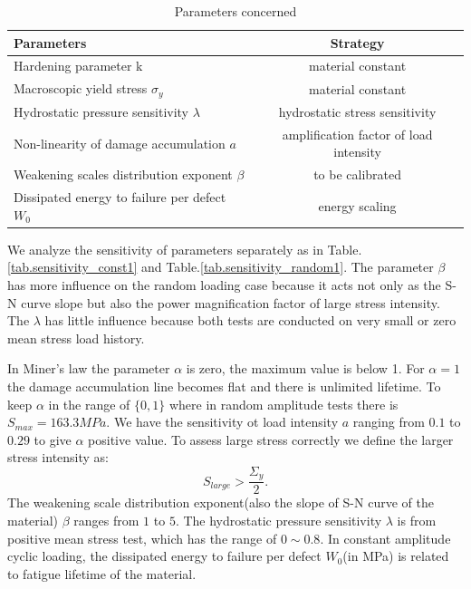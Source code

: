 \documentclass[3p,times,number,review]{elsarticle}
\begin{document}
\begin{table}[!h]
	\centering
	\begin{tabular}{l|c}
		\hline
		\textbf{Parameters}                                  & \multicolumn{1}{c}{\textbf{Strategy}} \\ \hline
		Hardening parameter k                                & material constant                      \\
		Macroscopic yield stress $\sigma_y$                  & material constant                      \\
		Hydrostatic pressure sensitivity $\lambda$           & hydrostatic stress sensitivity         \\
		Non-linearity of damage accumulation  $a$        & amplification factor of load intensity      \\
		Weakening scales distribution exponent  $\beta$      & to be calibrated                          \\
		Dissipated energy to failure per defect  $W_0$ & energy scaling               \\ \hline
	\end{tabular}
	\caption{Parameters concerned}
	\label{paras}
\end{table}

We analyze the sensitivity of parameters separately as in Table.\ref{tab.sensitivity_const1} and Table.\ref{tab.sensitivity_random1}. The parameter $\beta$ has more influence on the random loading case because it acts not only as the S-N curve slope but also the power magnification factor of large stress intensity. The $\lambda$ has little influence because both tests are conducted on very small or zero mean stress load history.


In Miner's law the parameter $\alpha$ is zero, the maximum value is below 1. For $\alpha=1$ the damage accumulation line becomes flat and there is unlimited lifetime. To keep $\alpha$ in the range of $\{0,1\}$ where in random amplitude tests there is $S_{max}=163.3MPa$. We have the sensitivity ot load intensity  $a$ ranging from $0.1$ to $0.29$ to give $\alpha$ positive value. 
To assess large stress correctly we define the larger stress intensity as: 
$$S_{large}>\dfrac{\Sigma_y}{2}.$$ 
 The weakening scale distribution exponent(also the slope of S-N curve of the material) $\beta$ ranges from $1$ to $5$. The hydrostatic pressure sensitivity $\lambda$ is from positive mean stress test, which has the range of $0\sim0.8$. In constant amplitude cyclic loading, the dissipated energy to failure per defect $W_0$(in MPa) is related to fatigue lifetime of the material.
\end{document}
